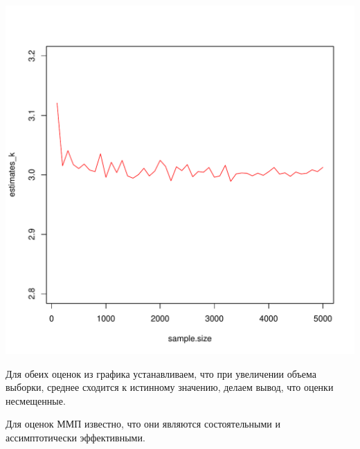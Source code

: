 \documentclass{article}\usepackage[]{graphicx}\usepackage[]{color}
\makeatletter
\def\maxwidth{ %
  \ifdim\Gin@nat@width>\linewidth
    \linewidth
  \else
    \Gin@nat@width
  \fi
}
\newenvironment{knitrout}{}{} %
\makeatother
\begin{document}
\begin{knitrout}
\includegraphics[width=\maxwidth]{figure/unnamed-chunk-17-2} 

\end{knitrout}

Для обеих оценок из графика устанавливаем, что при увеличении объема выборки, среднее сходится к истинному значению, делаем вывод, что оценки несмещенные.

Для оценок ММП известно, что они являются состоятельными и ассимптотически эффективными.
\end{document}
